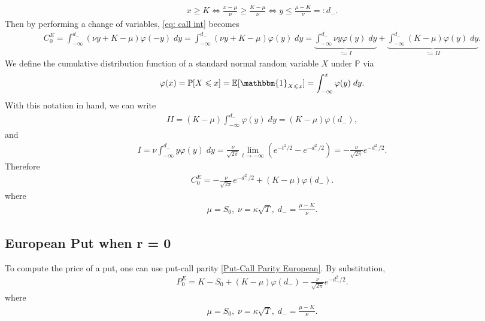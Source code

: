 \documentclass[reqno]{amsart}
\begin{document}
\begin{align}
	 x \ge K \Longleftrightarrow \frac{x-\mu}{\nu} \ge \frac{K - \mu}{\nu} \Longleftrightarrow y \le \frac{\mu - K}{\nu} =: d_-.
\end{align}
Then by performing a change of variables, \eqref{eq: call int} becomes 
\begin{align}
	 C^E_0 = \int_{-\infty}^{d_-} (\nu y + K - \mu) \varphi(-y) \; dy = \int_{-\infty}^{d_-} (\nu y + K - \mu) \varphi(y) \; dy = \underbrace{\int_{-\infty}^{d_-} \nu y \varphi(y) \; dy}_{:= I} + \underbrace{\int_{-\infty}^{d_-}  (K-\mu)\varphi(y) \; dy}_{:= II}.
\end{align}
We define the cumulative distribution function of a standard normal random variable $X$ under $\mathbb{P}$ via 
\begin{align}
	 \varphi(x) = \mathbb{P}[X \le x] = \E[ \mathbbm{1}_{X \le x}] = \int_{-\infty}^x \varphi(y) \; dy.
\end{align}
With this notation in hand, we can write 
\begin{align}
	 II = (K-\mu) \int_{-\infty}^{d_-} \varphi(y) \; dy = (K-\mu) \varphi(d_-),
\end{align}
and 
\begin{align}
	 I = \nu \int_{-\infty}^{d_-} y \varphi(y) \; dy =  \frac{\nu}{\sqrt{2\pi}} \lim_{t \to -\infty} (e^{-t^2/2} - e^{-d_-^2/2}) = -\frac{\nu}{\sqrt{2\pi}} e^{-d_-^2/2}.
\end{align}
Therefore 
\begin{align} \label{European Call r=0}
	 C^E_0 =  -\frac{\nu}{\sqrt{2\pi}} e^{-d_-^2/2} + (K-\mu) \varphi(d_-).
\end{align}
where 
\begin{align}
     \mu = S_0, \; \nu = \kappa \sqrt{T}, \; d_- = \frac{\mu - K}{\nu}.
\end{align}

\subsection{European Put when r = 0}
To compute the price of a put, one can use put-call parity \eqref{Put-Call Parity European}. 
By substitution, 
\begin{align}
     P^E_0 = K - S_0 + (K-\mu) \varphi(d_-) - \frac{\nu}{\sqrt{2\pi}} e^{-d_-^2/2}.
\end{align}
where 
\begin{align}
	 \mu = S_0, \; \nu = \kappa \sqrt{T}, \; d_- = \frac{\mu - K}{\nu}.
\end{align}
\end{document}
